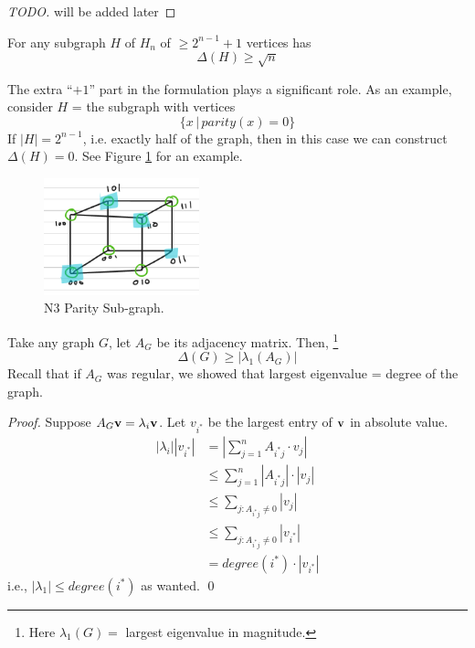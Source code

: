 \begin{proof}
	[TODO]
	will be added later
\end{proof}

\begin{theorem} 
	For any subgraph $H$ of $H_n$ of $\geq 2^{n - 1} + 1$ vertices has
	\begin{equation}
		\Delta (H) \geq \sqrt{n}
	\end{equation}	
\end{theorem}
The extra ``$+1$'' part in the formulation plays a significant role. As an example, consider $H$ = the subgraph with vertices 
\begin{equation}
	\{ x \,| \, parity (x) = 0 \} 
\end{equation}
If $|H| = 2^{n - 1}$, i.e. exactly half of the graph, then in this case we can construct $\Delta (H) = 0$. See Figure \ref{fig:n3 parity sub graph} for an example. 

\begin{figure}
	\centering
	\includegraphics[width=0.4\textwidth]{figs/n3-partity-graph.png}
	\caption{N3 Parity Sub-graph. \label{fig:n3 parity sub graph}}
\end{figure}

\begin{proposition}
	[Observation 1]
	Take any graph $G$, let $A_G$ be its adjacency matrix. Then, \footnote{Here $\lambda_1(G) = $ largest eigenvalue in magnitude. }
	\begin{equation}
		\Delta (G) \geq |\lambda_1 (A_G) | 
	\end{equation}
	Recall that if $A_G$ was regular, we showed that largest eigenvalue = degree of the graph. 
\end{proposition}
\begin{proof}
	Suppose $A_G \mathbf{v} = \lambda_i \mathbf{v}$. Let $v_{i^*}$ be the largest entry of $\mathbf{v}$ in absolute value. 
	\begin{align}
		|\lambda_i| | v_{i^* } |
		&= \left| \sum_{j = 1}^n A_{i^*j} \cdot v_j \right| \\
		&\leq \sum_{j = 1}^n |A_{i^*j}| \cdot |v_j| \\
		&\leq \sum_{j : A_{i^*j} \neq 0} |v_j|  \\
		&\leq \sum_{j: A_{i^* j} \neq 0} |v_{i^*}| \\
		&= degree( i^* ) \cdot | v_{i^*} | 
	\end{align}
	i.e., $|\lambda_1| \leq degree(i^*)$ as wanted. \qed
\end{proof}

